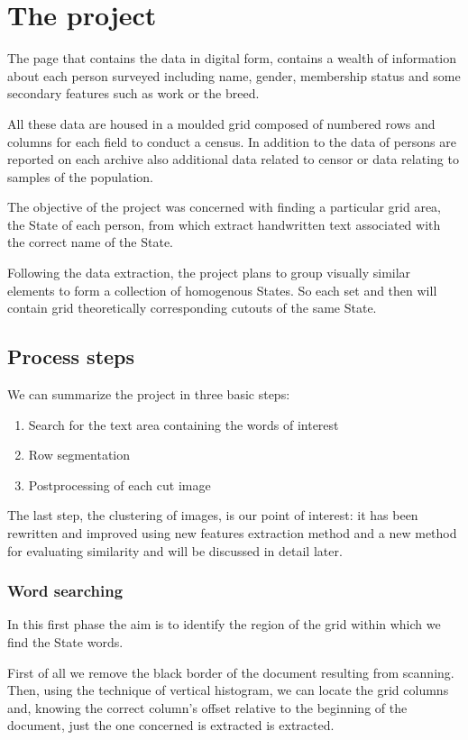 \documentclass[a4paper,12pt]{article}
\begin{document}
\section{The project}

The page that contains the data in digital form, contains a wealth of information about each person surveyed including name, gender, membership status and some secondary features such as work or the breed. 

All these data are housed in a moulded grid composed of numbered rows and columns for each field to conduct a census. In addition to the data of persons are reported on each archive also additional data related to censor or data relating to samples of the population.

The objective of the project was concerned with finding a particular grid area, the State of each person, from which extract handwritten text associated with the correct name of the State.

Following the data extraction, the project plans to group visually similar elements to form a collection of homogenous States. So each set and then will contain grid theoretically corresponding cutouts of the same State.

\subsection{Process steps}

We can summarize the project in three basic steps:
\begin{enumerate}
\item Search for the text area containing the words of interest
\item Row segmentation
\item Postprocessing of each cut image
\end{enumerate}

The last step, the clustering of images, is our point of interest: it has been rewritten and improved using new features extraction method and a new method for evaluating similarity and will be discussed in detail later.

\subsubsection{Word searching}

In this first phase the aim is to identify the region of the grid within which we find the State words. 

First of all we remove the black border of the document resulting from scanning. Then, using the technique of vertical histogram, we can locate the grid columns and, knowing the correct column's offset relative to the beginning of the document, just the one concerned is extracted is extracted.
\end{document}

